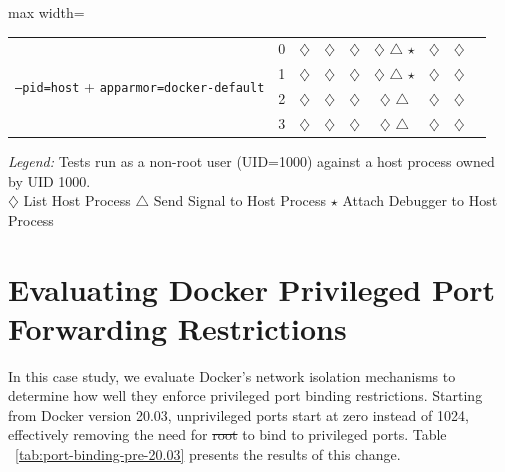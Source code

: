 \documentclass[12pt]{report}
\providecommand{\DIFaddtex}[1]{{\protect\color{blue}\uwave{#1}}} %
\providecommand{\DIFdeltex}[1]{{\protect\color{red}\sout{#1}}}                      %
\providecommand{\DIFaddbegin}{} %
\providecommand{\DIFaddend}{} %
\providecommand{\DIFdelbegin}{} %
\providecommand{\DIFdelend}{} %
\providecommand{\DIFadd}[1]{\texorpdfstring{\DIFaddtex{#1}}{#1}} %
\providecommand{\DIFdel}[1]{\texorpdfstring{\DIFdeltex{#1}}{}} %
\newcommand{\DIFscaledelfig}{0.5}
\newlength{\DIFdelgraphicswidth} %
\newlength{\DIFdelgraphicsheight} %
\newcommand{\DIFaddincludegraphics}[2][]{{\color{blue}\fbox{\DIFOincludegraphics[#1]{#2}}}} %
\newcommand{\DIFdelincludegraphics}[2][]{%
\sbox{\DIFdelgraphicsbox}{\DIFOincludegraphics[#1]{#2}}%
\settoboxwidth{\DIFdelgraphicswidth}{\DIFdelgraphicsbox} %
\settoboxtotalheight{\DIFdelgraphicsheight}{\DIFdelgraphicsbox} %
\scalebox{\DIFscaledelfig}{%
\parbox[b]{\DIFdelgraphicswidth}{\usebox{\DIFdelgraphicsbox}\\[-\baselineskip] \rule{\DIFdelgraphicswidth}{0em}}\llap{\resizebox{\DIFdelgraphicswidth}{\DIFdelgraphicsheight}{%
\setlength{\unitlength}{\DIFdelgraphicswidth}%
\begin{picture}(1,1)%
\thicklines\linethickness{2pt} %
{\color[rgb]{1,0,0}\put(0,0){\framebox(1,1){}}}%
{\color[rgb]{1,0,0}\put(0,0){\line( 1,1){1}}}%
{\color[rgb]{1,0,0}\put(0,1){\line(1,-1){1}}}%
\end{picture}%
}\hspace*{3pt}}} %
} %
\DeclareRobustCommand{\DIFaddbegin}{\DIFOaddbegin \let\includegraphics\DIFaddincludegraphics} %
\DeclareRobustCommand{\DIFaddend}{\DIFOaddend \let\includegraphics\DIFOincludegraphics} %
\DeclareRobustCommand{\DIFdelbegin}{\DIFOdelbegin \let\includegraphics\DIFdelincludegraphics} %
\DeclareRobustCommand{\DIFdelend}{\DIFOaddend \let\includegraphics\DIFOincludegraphics} %
\begin{document}
\begin{doublespace}
\begin{table}[!h]
\begin{adjustbox}{max width=\textwidth}
\begin{tabular}{|l|c|c|c|c|c|c|c|c|}
        \multirow{4}{*}{\texttt{--pid=host} + \texttt{apparmor=docker-default}} 
            & 0 & $\diamondsuit$ & $\diamondsuit$ & $\diamondsuit$ & $\diamondsuit$ $\triangle$ $\star$ & $\diamondsuit$ & $\diamondsuit$ \\
            & 1 & $\diamondsuit$ & $\diamondsuit$ & $\diamondsuit$ & $\diamondsuit$ $\triangle$ $\star$ & $\diamondsuit$ & $\diamondsuit$ \\
            & 2 & $\diamondsuit$ & $\diamondsuit$ & $\diamondsuit$ & $\diamondsuit$ $\triangle$ & $\diamondsuit$ & $\diamondsuit$ \\
            & 3 & $\diamondsuit$ & $\diamondsuit$ & $\diamondsuit$ & $\diamondsuit$ $\triangle$ & $\diamondsuit$ & $\diamondsuit$ \\
        \hline
    \end{tabular}
    \end{adjustbox}
    \textit{Legend:}{
        Tests run as a non-root user (UID=1000) against a host process owned by UID 1000.\\
        $\diamondsuit$ List Host Process \quad 
        $\triangle$ Send Signal to Host Process \quad 
        $\star$ Attach Debugger to Host Process
    }
\end{table}
























\section{Evaluating Docker Privileged Port Forwarding Restrictions}
\label{sec:evaluating-docker-privileged-port-forwarding-restrictions}

In this case study, we evaluate Docker's network isolation mechanisms to determine how well they enforce privileged port binding restrictions. Starting from Docker version 20.03, unprivileged ports start at zero instead of 1024, effectively removing the need for \DIFdelbegin \DIFdel{root }\DIFdelend \DIFaddbegin \DIFadd{NET\_BIND\_SERVICE }\DIFaddend to bind to privileged ports. Table ~\ref{tab:port-binding-pre-20.03} presents the results of this change.


\end{doublespace}
\end{document}
